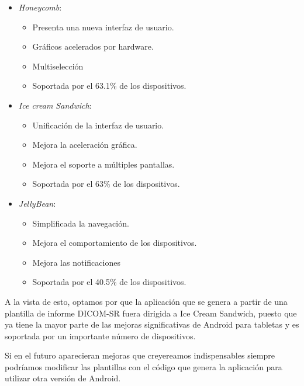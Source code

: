 \begin{itemize}
  \item \emph{Honeycomb}:
    \begin{itemize} 
      \item Presenta una nueva interfaz de usuario.
      \item Gráficos acelerados por hardware.
      \item Multiselección
      \item Soportada por el 63.1\% de los dispositivos.
    \end{itemize}
    \item \emph{Ice cream Sandwich}:
    \begin{itemize} 
      \item Unificación de la interfaz de usuario.
      \item Mejora la aceleración gráfica.
      \item Mejora el soporte a múltiples pantallas. 
      \item Soportada por el 63\% de los dispositivos.
    \end{itemize}
  \item \emph{JellyBean}:
    \begin{itemize} 
      \item Simplificada la navegación.
      \item Mejora el comportamiento de los dispositivos.
      \item Mejora las notificaciones
      \item Soportada por el 40.5\% de los dispositivos.
    \end{itemize}
\end{itemize}
A la vista de esto, optamos por que la aplicación que se genera a partir de una plantilla de informe DICOM-SR fuera dirigida a Ice Cream Sandwich, puesto que ya tiene la mayor parte de las mejoras significativas de Android para tabletas y es soportada por un importante número de dispositivos.\par
Si en el futuro aparecieran mejoras que creyereamos indispensables siempre podríamos modificar las plantillas con el código  que genera la aplicación para utilizar otra versión de Android.\par


